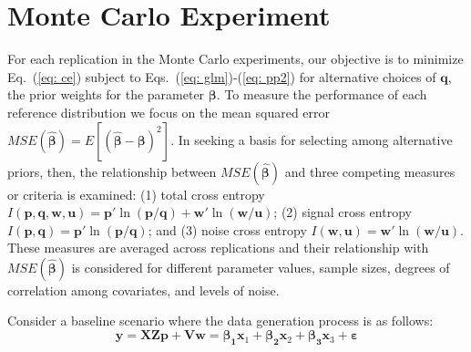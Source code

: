 \documentclass[english]{article}
\begin{document}

\section{Monte Carlo Experiment}
\label{sec: mce}

For each replication in the Monte Carlo experiments, our objective is to 
minimize Eq.\ (\ref{eq: ce}) subject to Eqs.\ (\ref{eq: glm})-(\ref{eq: pp2}) 
for alternative choices of $\mathbf{q}$, the prior weights for the parameter 
$\mathbf{\beta}$. 
To measure the performance of each reference distribution we focus on the 
mean squared error $MSE(\hat{\mathbf{\beta}}) = 
E[(\hat{\mathbf{\beta}}- \mathbf{\beta})^2]$.
In seeking a basis for selecting among alternative priors, then, the 
relationship between $MSE(\hat{\mathbf{\beta}})$ and three competing 
measures or criteria is examined: (1) total cross entropy $I({\mathbf{p}, 
\mathbf{q}, \mathbf{w}, \mathbf{u}}) = 
\mathbf{p}' \ln (\mathbf{p}/\mathbf{q}) 
+ \mathbf{w}' \ln (\mathbf{w}/\mathbf{u})$; (2) signal cross entropy 
$I(\mathbf{p}, \mathbf{q})= \mathbf{p}' \ln (\mathbf{p}/\mathbf{q})$;
and (3) noise cross entropy $I(\mathbf{w}, \mathbf{u}) = 
\mathbf{w}' \ln (\mathbf{w}/\mathbf{u})$.
These measures are averaged across replications and their relationship with $MSE(\hat{\mathbf{\beta}})$ is considered for different parameter values, 
sample sizes, degrees of correlation among covariates, and levels of noise.

Consider a baseline scenario where the data generation process is as follows:
\begin{equation}
\mathbf{y} = \mathbf{XZp} + \mathbf{Vw}
= \mathbf{\beta_1}\mathbf{x}_1 + \mathbf{\beta_2}\mathbf{x}_2
+ \mathbf{\beta_3}\mathbf{x}_3 + \mathbf{\varepsilon} 
\end{equation}
\end{document}
